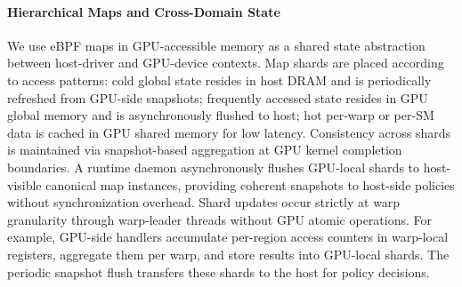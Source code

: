 \paragraph{Hierarchical Maps and Cross-Domain State}

We use eBPF maps in GPU-accessible memory as a shared state abstraction between host-driver and GPU-device contexts. Map shards are placed according to access patterns: cold global state resides in host DRAM and is periodically refreshed from GPU-side snapshots; frequently accessed state resides in GPU global memory and is asynchronously flushed to host; hot per-warp or per-SM data is cached in GPU shared memory for low latency. Consistency across shards is maintained via snapshot-based aggregation at GPU kernel completion boundaries. A runtime daemon asynchronously flushes GPU-local shards to host-visible canonical map instances, providing coherent snapshots to host-side policies without synchronization overhead. Shard updates occur strictly at warp granularity through warp-leader threads without GPU atomic operations. For example, GPU-side handlers accumulate per-region access counters in warp-local registers, aggregate them per warp, and store results into GPU-local shards. The periodic snapshot flush transfers these shards to the host for policy decisions.